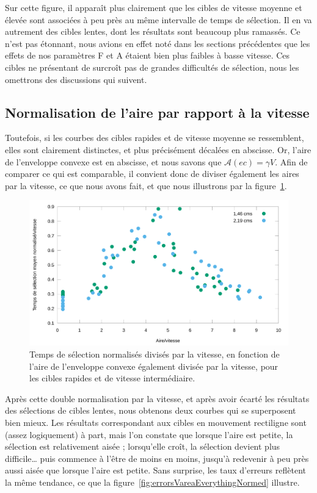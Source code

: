 	Sur cette figure, il apparaît plus clairement que les cibles de vitesse moyenne et élevée sont associées à peu près au même intervalle de temps de sélection. Il en va autrement des cibles lentes, dont les résultats sont beaucoup plus ramassés. Ce n'est pas étonnant, nous avions en effet noté dans les sections précédentes que les effets de nos paramètres F et A étaient bien plus faibles à basse vitesse. Ces cibles ne présentant de surcroît pas de grandes difficultés de sélection, nous les omettrons des discussions qui suivent.
	
	\subsection{Normalisation de l'aire par rapport à la vitesse}
	Toutefois, si les courbes des cibles rapides et de vitesse moyenne se ressemblent, elles sont clairement distinctes, et plus précisément décalées en abscisse. Or, l'aire de l'enveloppe convexe est en abscisse, et nous savons que $\mathcal{A}(ec) = \gamma{}V$. Afin de comparer ce qui est comparable, il convient donc de diviser également les aires par la vitesse, ce que nous avons fait, et que nous illustrons par la figure~\ref{fig:perfVareaEverythingNormed}.

	\begin{figure}[!htb]
		\centering
		\includegraphics[width=\textwidth]{figures/ch4/perfVareaEverythingNormed}
		\caption[Temps de sélection/V en fonction de $\mathcal{A}(ec)/V$]{Temps de sélection normalisés divisés par la vitesse, en fonction de l'aire de l'enveloppe convexe également divisée par la vitesse, pour les cibles rapides et de vitesse intermédiaire.}
		\label{fig:perfVareaEverythingNormed}
	\end{figure}
	
	Après cette double normalisation par la vitesse, et après avoir écarté les résultats des sélections de cibles lentes, nous obtenons deux courbes qui se superposent bien mieux. Les résultats correspondant aux cibles en mouvement rectiligne sont (assez logiquement) à part, mais l'on constate que lorsque l'aire est petite, la sélection est relativement aisée ; lorsqu'elle croît, la sélection devient plus difficile\ldots{} puis commence à l'être de moins en moins, jusqu'à redevenir à peu près aussi aisée que lorsque l'aire est petite. Sans surprise, les taux d'erreurs reflètent la même tendance, ce que la figure~\ref{fig:errorsVareaEverythingNormed} illustre.
	
